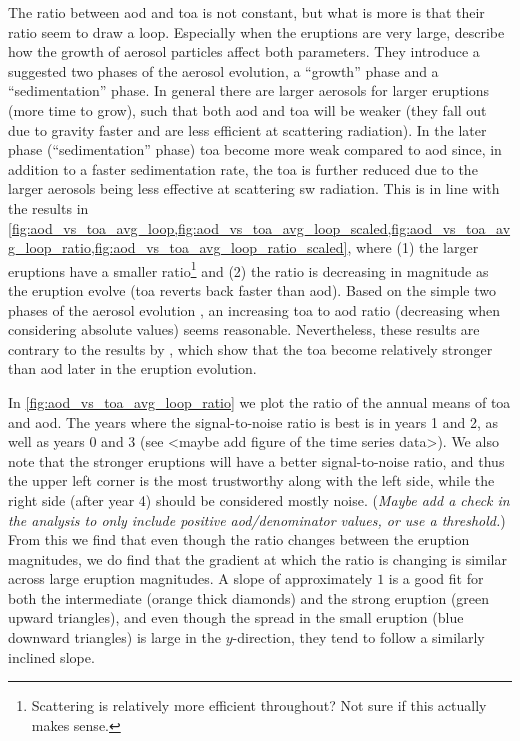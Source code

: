 \documentclass[twocol]{ametsocV5}
\begin{document}
The ratio between \acrshort{aod} and \acrshort{toa} is not constant, but what is more is
that their ratio seem to draw a loop. Especially when the eruptions are very large,
\citet[][see their sections 3.1.2, 3.2.2]{marshall2019} describe how the growth of
aerosol particles affect both parameters. They introduce a suggested two phases of the
aerosol evolution, a ``growth'' phase and a ``sedimentation'' phase. In general there
are larger aerosols for larger eruptions (more time to grow), such that both
\acrshort{aod} and \acrshort{toa} will be weaker (they fall out due to gravity faster
and are less efficient at scattering radiation). In the later phase (``sedimentation''
phase) \acrshort{toa} become more weak compared to \acrshort{aod} since, in addition to
a faster sedimentation rate, the \acrshort{toa} is further reduced due to the larger
aerosols being less effective at scattering \acrshort{sw} radiation. This is in line
with the results in
\cref{fig:aod_vs_toa_avg_loop,fig:aod_vs_toa_avg_loop_scaled,fig:aod_vs_toa_avg_loop_ratio,fig:aod_vs_toa_avg_loop_ratio_scaled},
where (1) the larger eruptions have a smaller ratio\footnote{Scattering is relatively
  more efficient throughout? Not sure if this actually makes sense.} and (2) the ratio is
decreasing in magnitude as the eruption evolve (\acrshort{toa} reverts back faster than
\acrshort{aod}). Based on the simple two phases of the aerosol evolution
\citep{marshall2019}, an increasing \acrshort{toa} to \acrshort{aod} ratio (decreasing
when considering absolute values) seems reasonable. Nevertheless, these results are
contrary to the results by \citet[][their figure 1c,d]{marshall2020}, which show that
the \acrshort{toa} become relatively stronger than \acrshort{aod} later in the eruption
evolution.

In \cref{fig:aod_vs_toa_avg_loop_ratio} we plot the ratio of the annual means of
\acrshort{toa} and \acrshort{aod}. The years where the signal-to-noise ratio is best is
in years 1 and 2, as well as years 0 and 3 (see <maybe add figure of the time series
data>). We also note that the stronger eruptions will have a better signal-to-noise
ratio, and thus the upper left corner is the most trustworthy along with the left side,
while the right side (after year 4) should be considered mostly noise. (\emph{Maybe add
  a check in the analysis to only include positive \acrshort{aod}/denominator values, or
  use a threshold.}) From this we find that even though the ratio changes between the
eruption magnitudes, we do find that the gradient at which the ratio is changing is
similar across large eruption magnitudes. A slope of approximately \( 1 \) is a good fit
for both the intermediate (orange thick diamonds) and the strong eruption (green upward
triangles), and even though the spread in the small eruption (blue downward triangles)
is large in the \( y \)-direction, they tend to follow a similarly inclined slope.
\end{document}
